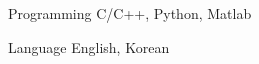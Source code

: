 
\begin{cvskills}

  \cvskill
    {Programming} %
    {C/C++, Python, Matlab} %

  \cvskill
    {Language} %
    {English, Korean} %

\end{cvskills}
